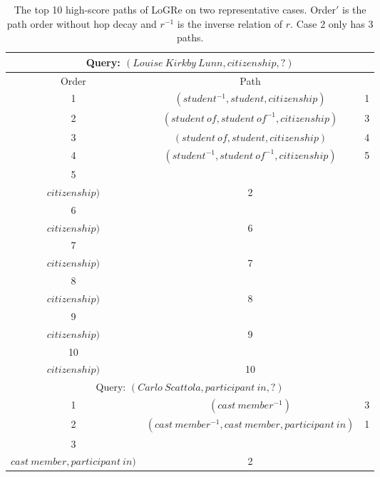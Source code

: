 \documentclass[sigconf]{acmart}
\begin{document}
\begin{table}[htb]
	\setlength{\tabcolsep}{0.15em}
	\centering
	\small
	\caption{The top 10 high-score paths of LoGRe on two representative cases. Order$'$ is the path order without hop decay and $r^{-1}$ is the inverse relation of $r$. Case 2 only has 3 paths.}
	\begin{tabular}{c|c|c}
		\toprule[1pt]
		\multicolumn{3}{c}{Query: $(Louise\ Kirkby\ Lunn, citizenship, ?)$}\\
		\midrule[0.5pt]
		Order &Path &\makecell[c]{Order$'$}\\
		\midrule[0.5pt]
		1 &$(student^{-1}, student, citizenship)$ &1\\
		2 &$(student\ of, student\ of^{-1}, citizenship)$ &3\\
		3 &$(student\ of, student, citizenship)$ &4\\
		4 &$(student^{-1}, student\ of^{-1}, citizenship)$ &5\\
		\midrule[0.5pt]
		5 &\makecell[c]{$(student^{-1}, student, citizenship, citizenship^{-1},$\\ $citizenship)$} &2\\
		6 &\makecell[c]{$(student^{-1}, student\ of^{-1}, citizenship, citizenship^{-1},$\\ $citizenship)$} &6\\
		7 &\makecell[c]{$(student\ of, student\ of^{-1}, citizenship, citizenship^{-1},$\\ $ citizenship)$} &7\\
		8 &\makecell[c]{$(student\ of, student, citizenship, citizenship^{-1},$\\ $ citizenship)$} &8\\
		\midrule[0.5pt]
		9 &\makecell[c]{$(student\ of, student\ of^{-1}, student\ of, student\ of^{-1},$\\ $ citizenship)$} &9\\
		10 &\makecell[c]{$(student\ of, student, student\ of, student\ of^{-1},$\\ $ citizenship)$} &10\\
		\bottomrule[1pt]
		\toprule[1pt]
		\multicolumn{3}{c}{Query: $(Carlo\ Scattola, participant\ in, ?)$}\\
		\midrule[0.5pt]
		1 &$(cast\ member^{-1})$ &3\\
		2 &$(cast\ member^{-1}, cast\ member, participant\ in)$ &1\\
		3 &\makecell[c]{$(cast\ member^{-1}, cast\ member, cast\ member^{-1},$\\ $ cast\ member, participant\ in)$} &2\\
		\bottomrule[1pt]
	\end{tabular}
	\label{table:case_study}
\end{table}
\end{document}
